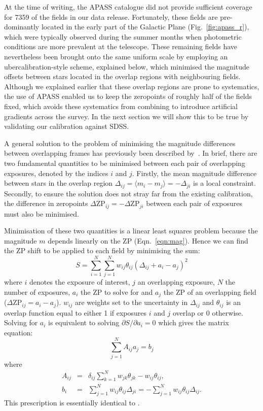 \documentclass[useAMS,usenatbib]{mn2e}
\begin{document}
At the time of writing, the APASS catalogue did not provide 
sufficient coverage for 7359 of the fields in our data release.
Fortunately, these fields are pre-dominantly located 
in the early part of the Galactic Plane (Fig.~\ref{fig:apass_r}),
which were typically observed during the summer months
when photometric conditions are more prevalent at the telescope.
These remaining fields have nevertheless 
been brought onto the same uniform scale 
by employing an ubercalibration-style scheme, explained below,
which minimised the magnitude offsets between stars
located in the overlap regions with neighbouring fields.
Although we explained earlier that these overlap regions
are prone to systematics, the use of APASS enabled us to
keep the zeropoints of roughly half of the fields fixed,
which avoids these systematics from combining to introduce
artificial gradients across the survey.
In the next section we will show this to be true by validating
our calibration against SDSS.

A general solution to the problem of minimising the magnitude
differences between overlapping frames has previously been
described by~\citet{Glazebrook1994}.
In brief, there are two fundamental quantities to be
minimised between each pair of overlapping exposures, 
denoted by the indices $i$ and $j$. 
Firstly, the mean magnitude difference between stars in the overlap
region $\Delta_{ij}=\langle m_i-m_j\rangle=-\Delta_{ji}$ is a local
constraint. 
Secondly, to ensure the solution does not stray far 
from the existing calibration, 
the difference in zeropoints 
$\Delta\mathrm{ZP}_{ij}=-\Delta\mathrm{ZP}_{ji}$ 
between each pair of exposures must also be minimised.

Minimisation of these two quantities is a linear least squares problem 
because the magnitude $m$ depends linearly on the ZP (Eqn.~\ref{eqn:mag}).
Hence we can find the ZP shift to be applied to each field 
by minimising the sum:
\begin{equation}
   S = \sum_{i=1}^N \sum_{j=1}^N w_{ij} \theta_{ij} (\Delta_{ij} + a_i - a_j)^2
   \label{eqn:chi2}
\end{equation}
where $i$ denotes the exposure of interest, 
$j$ an overlapping exposure, 
$N$ the number of exposures,
$a_i$ the ZP to solve for 
and $a_j$ the ZP of an overlapping field ($\Delta\mathrm{ZP}_{ij}=a_i-a_j$). 
$w_{ij}$ are weights set to the uncertainty in $\Delta_{ij}$
and $\theta_{ij}$ is an overlap function 
equal to either 1 if exposures $i$ and $j$ overlap or 0 otherwise. 
Solving for $a_i$ is equivalent to solving $\partial
S/\partial a_i=0$ which gives the matrix equation:
\begin{equation}
   \sum_{j=1}^N A_{ij} a_j = b_j
   \label{eqn:matrix}
\end{equation}
where 
\begin{eqnarray}
   A_{ij} &=& \delta_{ij} \sum_{k=1}^N w_{jk}\theta_{jk} - w_{ij} \theta_{ij},\label{eqn:aij}\\
   b_i &=& \sum_{j=1}^N w_{ij} \theta_{ij}\Delta_{ji} = -\sum_{j=1}^N w_{ij} \theta_{ij}\Delta_{ij}.\label{eqn:bi}
\end{eqnarray}
This prescription is essentially identical to \citet{Glazebrook1994}.
\end{document}
